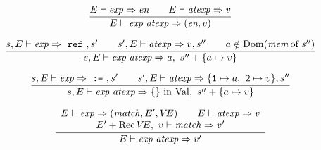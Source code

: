 \replacement{\theidstatus}{\begin{equation}	%
\label{conapp-dyn-rule}
\frac{\E\ts\exp\ra\con\qquad\con\neq\REF\qquad\E\ts\atexp\ra\V}
     {\E\ts\appexp\ra(\con,\V)}
\end{equation}}{\begin{equation}	%
\label{conapp-dyn-rule}
\frac{\E\ts\exp\ra\vid\qquad\vid\neq\REF\qquad\E\ts\atexp\ra\V}
     {\E\ts\appexp\ra(\vid,\V)}
\end{equation}}

\begin{equation}        %
\frac{\E\ts\exp\ra\e\qquad\E\ts\atexp\ra\V}
     {\E\ts\appexp\ra(\e,\V)}
\end{equation}

\begin{equation}	%
\label{refapp-dyn-rule}
\frac{\s,\E\ts\exp\ra~\ml{ref}~,\s'\qquad
      \s',\E\ts\atexp\ra\V,\s''\qquad
      \A\notin\Dom(\of{\mem}{\s''})}
     {\s,\E\ts\appexp\ra\A,\ \s''+\{\A\mapsto\V\} }
\end{equation}


\begin{equation}	%
\label{assapp-dyn-rule}
\frac{\s,\E\ts\exp\ra~\mbox{\tt :=}~,\s'\qquad
      \s',\E\ts\atexp\ra\{{\tt 1}\mapsto\A,\ {\tt 2}\mapsto\V\},\s''}
     {\s,\E\ts\appexp\ra\emptymap\ \In\ \Val,\ \s''+\{\A\mapsto\V\} }
\end{equation}
\oldpagebreak
{}

\begin{equation}	%
\label{closapp-dyn-rule}
\frac{\begin{array}{c}
      \E\ts\exp\ra(\match,\E',\VE)\qquad\E\ts\atexp\ra\V\\
      \E'+\Rec\VE,\ \V\ts\match\ra\V'
      \end{array}
     }
     {\E\ts\appexp\ra\V'}
\end{equation}

